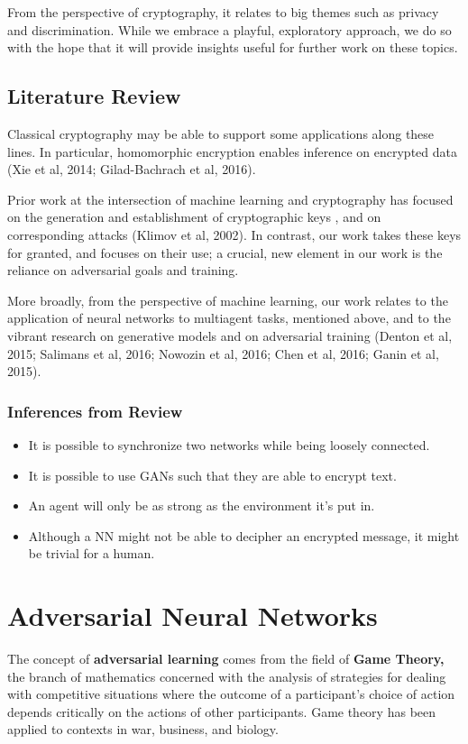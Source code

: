 \documentclass[a4paper]{article}
\begin{document}
    From the perspective of cryptography, it relates to big themes such as privacy and 
    discrimination. While we embrace a playful, exploratory  approach, we do so with the 
    hope that it will provide insights useful for further work on these topics.
    
    \subsection{Literature Review}
    Classical cryptography may be able to support some applications along these lines. In particular,
    homomorphic encryption enables inference on encrypted data (Xie et al, 2014; Gilad-Bachrach
    et al, 2016).

    Prior work at the intersection of machine learning and cryptography has focused on the 
    generation and establishment of cryptographic keys \cite{netsync}, and on corresponding
    attacks (Klimov et al, 2002). In contrast, our work takes these keys for granted, and 
    focuses on their use; a crucial, new element in our work is the reliance on adversarial 
    goals and training. 

    More broadly, from the perspective of machine learning, our work relates to the application of 
    neural networks to multiagent tasks, mentioned above, and to the vibrant research on 
    generative models and on adversarial training (Denton et al, 2015; 
    Salimans et al, 2016; Nowozin et al, 2016; Chen et al, 2016; Ganin et al, 2015).

      \subsubsection{Inferences from Review}
      \begin{itemize}
        \item It is possible to synchronize two networks while being loosely connected.
        \item It is possible to use GANs such that they are able to encrypt text.  
        \item An agent will only be as strong as the environment it's put in. 
        \item Although a NN might not be able to decipher an encrypted message, 
        it might be trivial for a human. 
      \end{itemize}

  \newpage 
  \section{Adversarial Neural Networks}
  The concept of {\bfseries adversarial learning} comes from the field of {\bfseries Game Theory,} the branch of 
  mathematics concerned with the analysis of strategies for dealing with competitive situations 
  where the outcome of a participant's choice of action depends critically on the actions 
  of other participants. Game theory has been applied to contexts in war, business, and biology.
\end{document}
